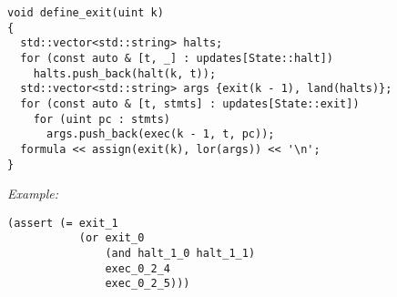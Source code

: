 \begin{lstlisting}[style=c++]
void define_exit(uint k)
{
  std::vector<std::string> halts;
  for (const auto & [t, _] : updates[State::halt])
    halts.push_back(halt(k, t));
  std::vector<std::string> args {exit(k - 1), land(halts)};
  for (const auto & [t, stmts] : updates[State::exit])
    for (uint pc : stmts)
      args.push_back(exec(k - 1, t, pc));
  formula << assign(exit(k), lor(args)) << '\n';
}
\end{lstlisting}

\noindent
\emph{Example:} 

\begin{lstlisting}[style=smtlib]
(assert (= exit_1
           (or exit_0
               (and halt_1_0 halt_1_1)
               exec_0_2_4
               exec_0_2_5)))
\end{lstlisting}



